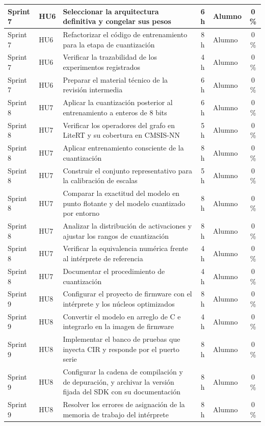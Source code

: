 \documentclass[
11pt, %
]{charter}
\begin{document}
\begin{longtable}{@{}|l|l|p{5.4cm}|c|l|c|@{}}
Sprint 7 & HU6 & Seleccionar la arquitectura definitiva y congelar sus pesos & 6 h & Alumno & 0 \% \\ \hline
Sprint 7 & HU6 & Refactorizar el código de entrenamiento para la etapa de cuantización & 8 h & Alumno & 0 \% \\ \hline
Sprint 7 & HU6 & Verificar la trazabilidad de los experimentos registrados & 4 h & Alumno & 0 \% \\ \hline
Sprint 7 & HU6 & Preparar el material técnico de la revisión intermedia & 6 h & Alumno & 0 \% \\ \hline
Sprint 8 & HU7 & Aplicar la cuantización posterior al entrenamiento a enteros de 8 bits & 6 h & Alumno & 0 \% \\ \hline
Sprint 8 & HU7 & Verificar los operadores del grafo en LiteRT y su cobertura en CMSIS-NN & 5 h & Alumno & 0 \% \\ \hline
Sprint 8 & HU7 & Aplicar entrenamiento consciente de la cuantización & 8 h & Alumno & 0 \% \\ \hline
Sprint 8 & HU7 & Construir el conjunto representativo para la calibración de escalas & 5 h & Alumno & 0 \% \\ \hline
Sprint 8 & HU7 & Comparar la exactitud del modelo en punto flotante y del modelo cuantizado por entorno & 8 h & Alumno & 0 \% \\ \hline
Sprint 8 & HU7 & Analizar la distribución de activaciones y ajustar los rangos de cuantización & 8 h & Alumno & 0 \% \\ \hline
Sprint 8 & HU7 & Verificar la equivalencia numérica frente al intérprete de referencia & 4 h & Alumno & 0 \% \\ \hline
Sprint 8 & HU7 & Documentar el procedimiento de cuantización & 4 h & Alumno & 0 \% \\ \hline
Sprint 9 & HU8 & Configurar el proyecto de firmware con el intérprete y los núcleos optimizados & 8 h & Alumno & 0 \% \\ \hline
Sprint 9 & HU8 & Convertir el modelo en arreglo de C e integrarlo en la imagen de firmware & 4 h & Alumno & 0 \% \\ \hline
Sprint 9 & HU8 & Implementar el banco de pruebas que inyecta CIR y responde por el puerto serie & 8 h & Alumno & 0 \% \\ \hline
Sprint 9 & HU8 & Configurar la cadena de compilación y de depuración, y archivar la versión fijada del SDK con su documentación & 8 h & Alumno & 0 \% \\ \hline
Sprint 9 & HU8 & Resolver los errores de asignación de la memoria de trabajo del intérprete & 8 h & Alumno & 0 \% \\ \hline

\end{longtable}
\end{document}
